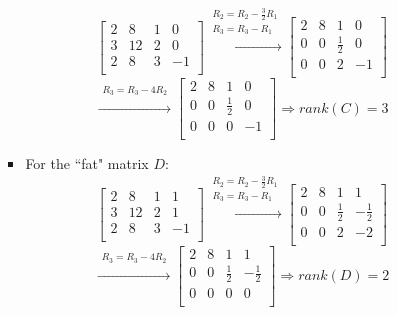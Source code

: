 \documentclass[letterpaper,11pt]{article}
\begin{document}
\begin{enumerate}
\begin{enumerate}
\begin{itemize}
		$$\left[\begin{array}{cccc}
		2 & 8 & 1 & 0 \\
		3 & 12 & 2 & 0 \\
		2 & 8 & 3 & -1 \\
		\end{array}\right] \xrightarrow{\begin{array}{c}
		R_2=R_2-\frac{3}{2}R_1 \\
		R_3=R_3-R_1\\
		\end{array}} \left[\begin{array}{cccc}
		2 & 8 & 1 & 0 \\
		0 & 0 & \frac{1}{2} & 0 \\
		0 & 0 & 2 & -1 \\
		\end{array}\right] $$
		$$\xrightarrow{\begin{array}{c}
		R_3 = R_3 - 4 R_2 \\
		\end{array}} \left[\begin{array}{cccc}
		2 & 8 & 1 & 0 \\
		0 & 0 & \frac{1}{2} & 0 \\
		0 & 0 & 0 & -1 \\
		\end{array}\right] \Rightarrow rank(C)=3$$
		\item For the ``fat" matrix $D$:
		$$\left[\begin{array}{cccc}
		2 & 8 & 1 & 1 \\
		3 & 12 & 2 & 1 \\
		2 & 8 & 3 & -1 \\
		\end{array}\right] \xrightarrow{\begin{array}{c}
		R_2=R_2-\frac{3}{2}R_1 \\
		R_3=R_3-R_1\\
		\end{array}} \left[\begin{array}{cccc}
		2 & 8 & 1 & 1 \\
		0 & 0 & \frac{1}{2} & -\frac{1}{2} \\
		0 & 0 & 2 & -2 \\
		\end{array}\right] $$
		$$\xrightarrow{\begin{array}{c}
		R_3 = R_3 - 4 R_2 \\
		\end{array}} \left[\begin{array}{cccc}
		2 & 8 & 1 & 1 \\
		0 & 0 & \frac{1}{2} & -\frac{1}{2} \\
		0 & 0 & 0 & 0 \\
		\end{array}\right] \Rightarrow rank(D)=2$$
	\end{itemize}
	

\end{enumerate}
\end{enumerate}
\end{document}
